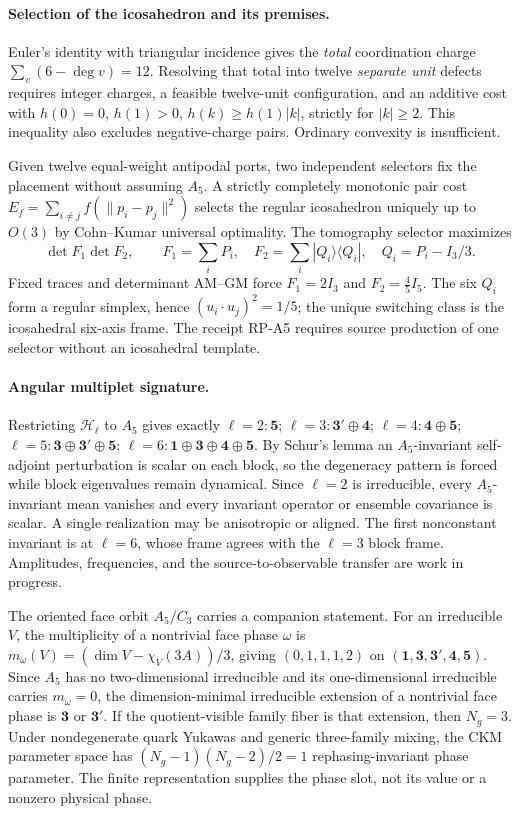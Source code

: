 \documentclass[11pt]{article}
\begin{document}
\paragraph{Selection of the icosahedron and its premises.} Euler's
identity with triangular incidence gives the \emph{total} coordination charge
\(\sum_v(6-\deg v)=12\). Resolving that total into twelve \emph{separate unit}
defects requires integer charges, a feasible twelve-unit configuration, and an
additive cost with \(h(0)=0\), \(h(1)>0\),
\(h(k)\ge h(1)|k|\), strictly for \(|k|\ge2\). This inequality also excludes
negative-charge pairs. Ordinary convexity is insufficient.

Given twelve equal-weight antipodal ports, two independent selectors fix the
placement without assuming \(A_5\). A strictly completely monotonic pair cost
\(E_f=\sum_{i\ne j}f(\|p_i-p_j\|^2)\) selects the regular icosahedron uniquely
up to \(O(3)\) by Cohn--Kumar universal optimality. The tomography selector
maximizes
\[
 \det F_1\det F_2,\qquad
 F_1=\sum_iP_i,\quad
 F_2=\sum_i|Q_i\rangle\langle Q_i|,\quad Q_i=P_i-I_3/3.
\]
Fixed traces and determinant AM--GM force \(F_1=2I_3\) and
\(F_2=\tfrac45I_5\). The six \(Q_i\) form a regular simplex, hence
\((u_i\cdot u_j)^2=1/5\); the unique switching class is the icosahedral
six-axis frame. The receipt \textsc{RP-A5} requires source production of one
selector without an icosahedral template.

\paragraph{Angular multiplet signature.} Restricting \(\mathcal H_\ell\) to
\(A_5\) gives exactly
\(\ell=2:\mathbf5\); \(\ell=3:\mathbf3'\oplus\mathbf4\);
\(\ell=4:\mathbf4\oplus\mathbf5\);
\(\ell=5:\mathbf3\oplus\mathbf3'\oplus\mathbf5\);
\(\ell=6:\mathbf1\oplus\mathbf3\oplus\mathbf4\oplus\mathbf5\).
By Schur's lemma an \(A_5\)-invariant self-adjoint perturbation is scalar on
each block, so the degeneracy pattern is forced while block eigenvalues remain
dynamical. Since \(\ell=2\) is irreducible, every \(A_5\)-invariant mean
vanishes and every invariant operator or ensemble covariance is scalar. A
single realization may be anisotropic or aligned. The first nonconstant
invariant is at \(\ell=6\), whose frame agrees with the \(\ell=3\) block frame.
Amplitudes, frequencies, and the source-to-observable transfer are work in
progress.

The oriented face orbit \(A_5/C_3\) carries a companion statement. For an
irreducible \(V\), the multiplicity of a nontrivial face phase \(\omega\) is
\(m_\omega(V)=(\dim V-\chi_V(3A))/3\), giving \((0,1,1,1,2)\) on
\((\mathbf1,\mathbf3,\mathbf3',\mathbf4,\mathbf5)\). Since \(A_5\) has no
two-dimensional irreducible and its one-dimensional irreducible carries
\(m_\omega=0\), the dimension-minimal irreducible extension of a nontrivial
face phase is \(\mathbf3\) or \(\mathbf3'\). If the quotient-visible family
fiber is that extension, then \(N_g=3\). Under nondegenerate quark Yukawas and
generic three-family mixing, the CKM parameter space has
\((N_g-1)(N_g-2)/2=1\) rephasing-invariant phase parameter. The finite
representation supplies the phase slot, not its value or a nonzero physical
phase.
\end{document}
